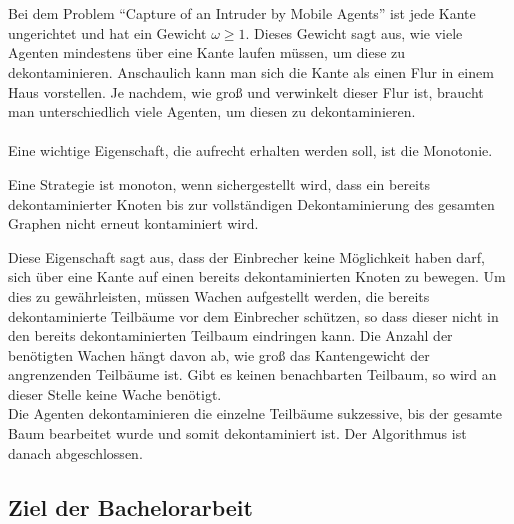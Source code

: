 \\
\\
Bei dem Problem "`Capture of an Intruder by Mobile Agents"' ist jede Kante ungerichtet und hat ein Gewicht $\omega \geq 1$. Dieses Gewicht sagt aus, wie viele Agenten mindestens über eine Kante laufen müssen, um diese zu dekontaminieren. Anschaulich kann man sich die Kante als einen Flur in einem Haus vorstellen. Je nachdem, wie groß und verwinkelt dieser Flur ist, braucht man unterschiedlich viele Agenten, um diesen  zu dekontaminieren.
\\
\\
Eine wichtige Eigenschaft, die aufrecht erhalten werden soll, ist die Monotonie. 
\begin{mydef}\label{def_monotonie}
	Eine Strategie ist monoton, wenn sichergestellt wird, dass ein bereits dekontaminierter Knoten bis zur vollständigen Dekontaminierung des gesamten Graphen nicht erneut kontaminiert wird.
\end{mydef}
Diese Eigenschaft sagt aus, dass der Einbrecher keine Möglichkeit haben darf, sich über eine Kante auf einen bereits dekontaminierten Knoten zu bewegen. Um dies zu gewährleisten, müssen Wachen aufgestellt werden, die bereits dekontaminierte Teilbäume vor dem Einbrecher schützen, so dass dieser nicht in den bereits dekontaminierten Teilbaum eindringen kann. Die Anzahl der benötigten Wachen hängt davon ab, wie groß das Kantengewicht der angrenzenden Teilbäume ist. Gibt es keinen benachbarten Teilbaum, so wird an dieser Stelle keine Wache benötigt.\\
Die Agenten dekontaminieren die einzelne Teilbäume sukzessive, bis der gesamte Baum bearbeitet wurde und somit dekontaminiert ist. Der Algorithmus ist danach abgeschlossen.

\subsection{Ziel der Bachelorarbeit}

